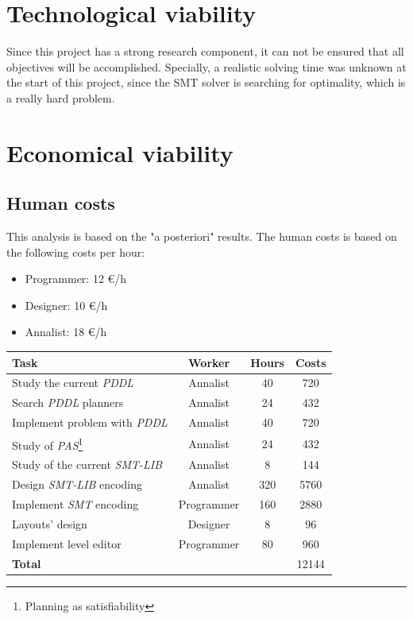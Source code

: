 \documentclass{report}
\theoremstyle{plain}
\begin{document}
\section{Technological viability}
Since this project has a strong research component, it can not be ensured that all objectives will be accomplished. Specially, a realistic solving time was unknown at the start of this project, since the SMT solver is searching for optimality, which is a really hard problem. 

\section{Economical viability}
\subsection{Human costs}
This analysis is based on the "a posteriori" results. The human costs is based on the following costs per hour:
\begin{itemize}
    \item Programmer: 12 \euro/h
    \item Designer: 10 \euro/h
    \item Annalist: 18 \euro/h
\end{itemize}

\begin{tabular}{||l|c|c|c||}
    \hline
    \textbf{Task} & \textbf{Worker} & \textbf{Hours} & \textbf{Costs} \\
    \hline\hline
    \hline
    Study the current \emph{PDDL} & Annalist & 40 & 720\\
    \hline
    Search \emph{PDDL} planners & Annalist & 24 & 432 \\
    \hline
    Implement problem with \emph{PDDL} & Annalist & 40 & 720 \\
    \hline
    Study of \emph{PAS}\footnote{Planning as satisfiability} & Annalist & 24 & 432 \\
    \hline
    Study of the current \emph{SMT-LIB} & Annalist & 8 & 144 \\
    \hline
    Design \emph{SMT-LIB} encoding & Annalist & 320 & 5760 \\
    \hline
    Implement \emph{SMT} encoding & Programmer & 160 & 2880 \\
    \hline
    Layouts' design & Designer & 8 & 96 \\
    \hline
    Implement level editor & Programmer & 80 & 960 \\
    \hline\hline
    \textbf{Total} & & & 12144 \\
    \hline
\end{tabular}
\end{document}
